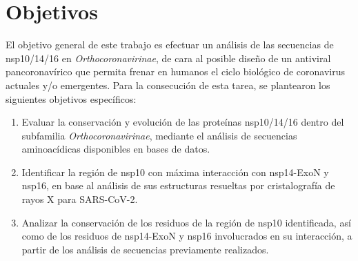 \section{Objetivos}

\sloppy El objetivo general de este trabajo es efectuar un análisis de las 
secuencias de nsp10/14/16 en \textit{Orthocoronavirinae}, de cara al posible
diseño de un antiviral pancoronavírico que permita frenar en humanos el 
ciclo biológico de coronavirus actuales y/o emergentes. Para la consecución 
de esta tarea, se plantearon los siguientes objetivos específicos: 
    
\begin{enumerate}

    \item Evaluar la conservación y evolución de las proteínas nsp10/14/16 
    dentro del subfamilia \textit{Orthocoronavirinae}, mediante el análisis de 
    secuencias aminoacídicas disponibles en bases de datos. 
    
    \item Identificar la región de nsp10 con máxima interacción con nsp14-ExoN y
    nsp16, en base al análisis de sus estructuras resueltas por cristalografía 
    de rayos X para SARS-CoV-2. 
    
    \item Analizar la conservación de los residuos de la región de 
    nsp10 identificada, así como de los residuos de nsp14-ExoN y nsp16 
    involucrados en su interacción, a partir de los análisis de secuencias 
    previamente realizados.

\end{enumerate}